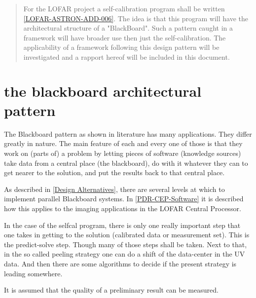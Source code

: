 \documentclass[]{lofar}
\begin{document}
  \maketitle

  \begin{abstract}

    For the LOFAR project a self-calibration program shall be written
    \hyperlink{LOFAR-ASTRON-ADD-006}{[LOFAR-ASTRON-ADD-006]}. The idea
    is that this program will have the architectural structure of a
    "BlackBoard". Such a pattern caught in a framework will have
    broader use then just the self-calibration. The applicability of a
    framework following this design pattern will be investigated and a
    rapport hereof will be included in this document.

  \end{abstract}

  \section{the blackboard architectural pattern}
  \label{id2719941}\hypertarget{id2719941}{}%

    The Blackboard pattern as shown in literature has many
    applications. They differ greatly in nature. The main feature of
    each and every one of those is that they work on (parts of) a
    problem by letting pieces of software (knowledge sources) take
    data from a central place (the blackboard), do with it whatever
    they can to get nearer to the solution, and put the results back
    to that central place.

    As described in \hyperlink{bib-Design-Alternatives}{[Design Alternatives]}, there are
    several levels at which to implement parallel Blackboard
    systems. In \hyperlink{PDR-CEP-Software}{[PDR-CEP-Software]} it is
    described how this applies to the imaging applications in the
    LOFAR Central Processor.

    In the case of the selfcal program, there is only one really
    important step that one takes in getting to the solution
    (calibrated data or measurement set). This is the predict-solve
    step. Though many of those steps shall be taken. Next to that, in
    the so called peeling strategy one can do a shift of the
    data-center in the UV data. And then there are some algorithms to
    decide if the present strategy is leading somewhere.

    \begin{em}

      It is assumed that the quality of a preliminary result can be
      measured.

    \end{em}
\end{document}
